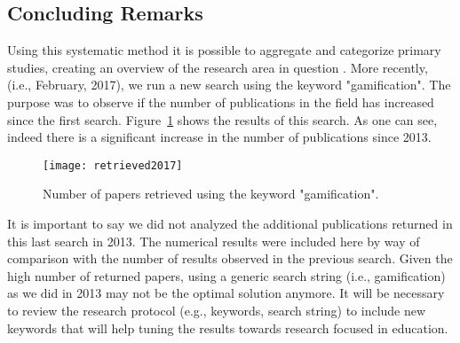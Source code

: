 \subsection{Concluding Remarks}

Using this systematic method it is possible to aggregate and categorize primary studies, creating an overview of the research area in question \cite{petersen2008}. More recently, (i.e., February, 2017), we run a new search using the keyword "gamification". The purpose was to observe if the number of publications in the field has increased since the first search.  
Figure~\ref{fig:retrieved2017} shows the results of this search. As one can see, indeed there is a significant increase in the number of publications since 2013. 

\begin{figure}[h!]
\caption{Number of papers retrieved using the keyword "gamification".}
\centering
\texttt{[image: retrieved2017]}
\label{fig:retrieved2017}
\end{figure}

It is important to say we did not analyzed the additional publications returned in this last search in 2013. The numerical results were included here by way of comparison with the number of results observed in the previous search. Given the high number of returned papers, using a generic search string (i.e., gamification) as we did in 2013 may not be the optimal solution anymore. It will be necessary to review the research protocol (e.g., keywords, search string) to include new keywords that will help tuning the results towards research focused in education.
